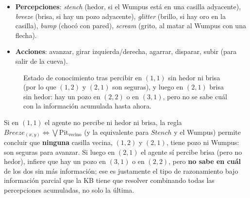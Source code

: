 \begin{itemize}
    \item \textbf{Percepciones}: \emph{stench} (hedor, si el Wumpus está en una casilla adyacente), \emph{breeze}
    (brisa, si hay un pozo adyacente), \emph{glitter} (brillo, si hay oro en la casilla), \emph{bump} (chocó con
    pared), \emph{scream} (grito, al matar al Wumpus con una flecha).
    \item \textbf{Acciones}: avanzar, girar izquierda/derecha, agarrar, disparar, subir (para salir de la cueva).
\end{itemize}

\begin{figure}[H]
\centering
{}
\caption{Estado de conocimiento tras percibir en $(1,1)$ sin hedor ni brisa (por lo que $(1,2)$ y $(2,1)$ son
seguras), y luego en $(2,1)$ brisa sin hedor: hay un pozo en $(2,2)$ o en $(3,1)$, pero no se sabe cuál con la
información acumulada hasta ahora.}
\end{figure}

\begin{example}
    Si en $(1,1)$ el agente no percibe ni hedor ni brisa, la regla $Breeze_{(x,y)} \Leftrightarrow \bigvee \text{Pit}_{\text{vecino}}$
    (y la equivalente para $Stench$ y el Wumpus) permite concluir que \textbf{ninguna} casilla vecina, $(1,2)$ y
    $(2,1)$, tiene pozo ni Wumpus: son seguras para avanzar. Si luego en $(2,1)$ el agente sí percibe brisa (pero no
    hedor), infiere que hay un pozo en $(3,1)$ o en $(2,2)$, pero \textbf{no sabe en cuál} de los dos sin más
    información; ese es justamente el tipo de razonamiento bajo información parcial que la KB tiene que resolver
    combinando todas las percepciones acumuladas, no solo la última.
\end{example}

